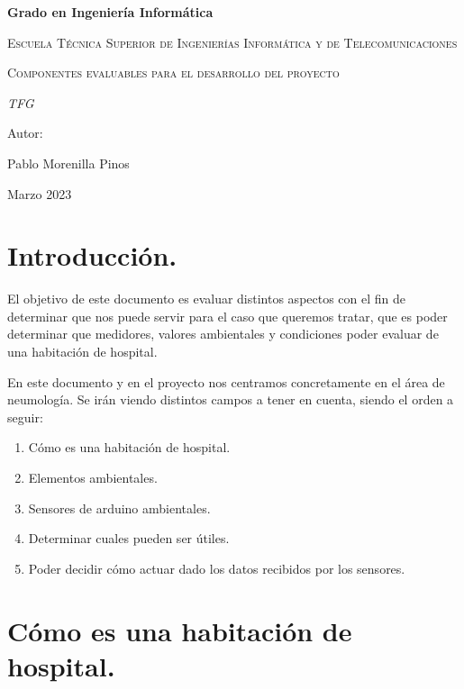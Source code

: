 \documentclass[a4paper]{article}
\begin{document}
    \begin{titlepage}
        \centering
        {\bfseries\LARGE Grado en Ingeniería Informática \par}
        \vspace{1cm}
        {\scshape\Large Escuela Técnica Superior de Ingenierías Informática y de Telecomunicaciones \par}
        \vspace{1cm}
        {\scshape\LARGE Componentes evaluables para el desarrollo del proyecto \par}
        \vspace{1cm}
        {\itshape\Large TFG \par}
        \vfill 
        {\Large Autor: \par}
        {\Large Pablo Morenilla Pinos \par}
        \vfill
        {\Large Marzo 2023 \par}
    \end{titlepage}

\clearpage

\section{Introducción.}
El objetivo de este documento es evaluar distintos aspectos con el fin de determinar que nos puede servir para el caso que queremos tratar, que es poder determinar que medidores, valores ambientales y condiciones poder evaluar de una habitación de hospital.
 
 En este documento y en el proyecto nos centramos concretamente en el área de neumología.
 Se irán viendo distintos campos a tener en cuenta, siendo el orden a seguir:
 \begin{enumerate}
 	\item Cómo es una habitación de hospital.
 	\item Elementos ambientales.
 	\item Sensores de arduino ambientales.
 	\item Determinar cuales pueden ser útiles.
 	\item Poder decidir cómo actuar dado los datos recibidos por los sensores.
 \end{enumerate}

\clearpage

\section{Cómo es una habitación de hospital.}
\end{document}
